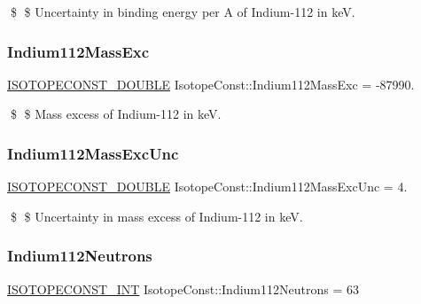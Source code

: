 \$ \$ Uncertainty in binding energy per A of Indium-\/112 in keV. \mbox{\label{group___isotope_const-_indium-_in112_ga10a142a463d1334fd455675d1e0e811d}} 
\subsubsection{\texorpdfstring{Indium112\+Mass\+Exc}{Indium112MassExc}}
{\footnotesize\ttfamily \mbox{\hyperlink{group___isotope_const-_macros_ga8f45a7272ce02c0b4c65c44636ed719a}{I\+S\+O\+T\+O\+P\+E\+C\+O\+N\+S\+T\+\_\+\+D\+O\+U\+B\+LE}} Isotope\+Const\+::\+Indium112\+Mass\+Exc = -\/87990.}

\$ \$ Mass excess of Indium-\/112 in keV. \mbox{\label{group___isotope_const-_indium-_in112_ga80f90ef726d9a6c1fa15e2dfb15f4c8e}} 
\subsubsection{\texorpdfstring{Indium112\+Mass\+Exc\+Unc}{Indium112MassExcUnc}}
{\footnotesize\ttfamily \mbox{\hyperlink{group___isotope_const-_macros_ga8f45a7272ce02c0b4c65c44636ed719a}{I\+S\+O\+T\+O\+P\+E\+C\+O\+N\+S\+T\+\_\+\+D\+O\+U\+B\+LE}} Isotope\+Const\+::\+Indium112\+Mass\+Exc\+Unc = 4.}

\$ \$ Uncertainty in mass excess of Indium-\/112 in keV. \mbox{\label{group___isotope_const-_indium-_in112_gae919727f6b3f5c80d8d23961eab32aa6}} 
\subsubsection{\texorpdfstring{Indium112\+Neutrons}{Indium112Neutrons}}
{\footnotesize\ttfamily \mbox{\hyperlink{group___isotope_const-_macros_ga5f18360b3e99483a35c32d789e62621c}{I\+S\+O\+T\+O\+P\+E\+C\+O\+N\+S\+T\+\_\+\+I\+NT}} Isotope\+Const\+::\+Indium112\+Neutrons = 63}

